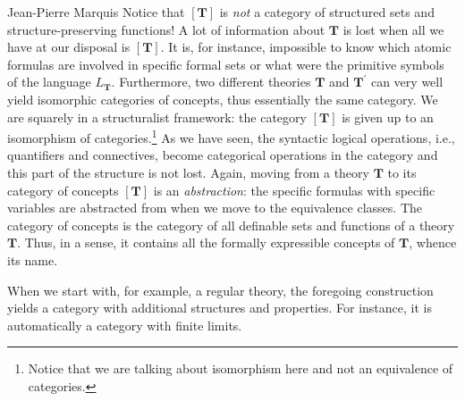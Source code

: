 \begin{artengenv}{Jean-Pierre Marquis}
Notice that \( [\mathbf{T}] \) is \textit{not} a category of structured sets and structure-preserving functions! A lot of information about \( \mathbf{T} \) is lost when all we have at our disposal is \( [\mathbf{T}] \). It is, for instance, impossible to know which atomic formulas are involved in specific formal sets or what were the primitive symbols of the language \( L_\mathbf{T} \). Furthermore, two different theories \( \mathbf{T} \) and \( \mathbf{T}^\prime \) can very well yield isomorphic categories of concepts, thus essentially the same category. We are squarely in a structuralist framework: the category \( [\mathbf{T}] \) is given up to an isomorphism of categories.\footnote{Notice that we are talking about isomorphism here and not an equivalence of categories.} As we have seen, the syntactic logical operations, i.e., quantifiers and connectives, become categorical operations in the category and this part of the structure is not lost. Again, moving from a theory \( \mathbf{T} \) to its category of concepts \( [\mathbf{T}] \) is an \textit{abstraction}: the  specific formulas with specific variables are abstracted from when we move to the equivalence classes. The category of concepts is the category of all definable sets and functions of a theory \( \mathbf{T} \). Thus, in a sense, it contains all the formally expressible concepts of \( \mathbf{T} \), whence its name. 

When we start with, for example, a regular theory, the foregoing construction yields a category with additional structures and properties. For instance, it is automatically a category with finite limits. 


\end{artengenv}

